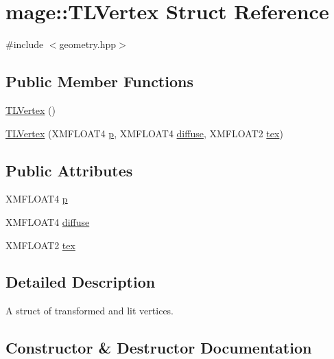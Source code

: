 \hypertarget{structmage_1_1_t_l_vertex}{}\section{mage\+:\+:T\+L\+Vertex Struct Reference}
\label{structmage_1_1_t_l_vertex}


{\ttfamily \#include $<$geometry.\+hpp$>$}

\subsection*{Public Member Functions}
\begin{DoxyCompactItemize}
\item 
\hyperlink{structmage_1_1_t_l_vertex_a281016b2cd959f1084fb69292b2e0609}{T\+L\+Vertex} ()
\item 
\hyperlink{structmage_1_1_t_l_vertex_a13b34e43c6f2d76b2336f3efe23b1cf9}{T\+L\+Vertex} (X\+M\+F\+L\+O\+A\+T4 \hyperlink{structmage_1_1_t_l_vertex_a5ac68e9f9767dae9455134891712baf1}{p}, X\+M\+F\+L\+O\+A\+T4 \hyperlink{structmage_1_1_t_l_vertex_a78d60c6622bc1091f2c1c30da0715236}{diffuse}, X\+M\+F\+L\+O\+A\+T2 \hyperlink{structmage_1_1_t_l_vertex_a17f1147ee6b76ea2e99364ed008c1ea2}{tex})
\end{DoxyCompactItemize}
\subsection*{Public Attributes}
\begin{DoxyCompactItemize}
\item 
X\+M\+F\+L\+O\+A\+T4 \hyperlink{structmage_1_1_t_l_vertex_a5ac68e9f9767dae9455134891712baf1}{p}
\item 
X\+M\+F\+L\+O\+A\+T4 \hyperlink{structmage_1_1_t_l_vertex_a78d60c6622bc1091f2c1c30da0715236}{diffuse}
\item 
X\+M\+F\+L\+O\+A\+T2 \hyperlink{structmage_1_1_t_l_vertex_a17f1147ee6b76ea2e99364ed008c1ea2}{tex}
\end{DoxyCompactItemize}


\subsection{Detailed Description}
A struct of transformed and lit vertices. 

\subsection{Constructor \& Destructor Documentation}
\hypertarget{structmage_1_1_t_l_vertex_a281016b2cd959f1084fb69292b2e0609}{}\label{structmage_1_1_t_l_vertex_a281016b2cd959f1084fb69292b2e0609} 
